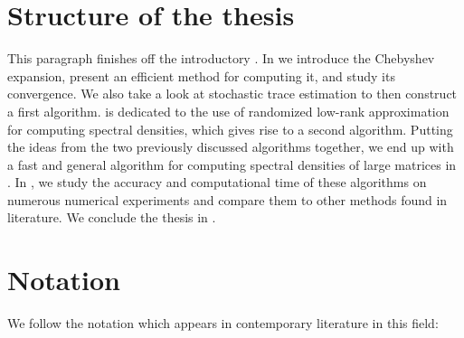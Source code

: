 \section{Structure of the thesis}
\label{sec:1-introduction-structure}

This paragraph finishes off the introductory .
In  we introduce the Chebyshev expansion, present an
efficient method for computing it, and study its convergence. We also take a
look at stochastic trace estimation to then construct a first algorithm.
 is dedicated to the use of randomized low-rank approximation
for computing spectral densities, which gives rise to a second algorithm.
Putting the ideas from the two previously discussed algorithms together,
we end up with a fast and general algorithm for computing spectral densities
of large matrices in . In ,
we study the accuracy and computational time of these algorithms on numerous
numerical experiments and compare them to other methods found in literature.
We conclude the thesis in .


\section{Notation}
\label{sec:1-introduction-notation}

We follow the notation which appears in contemporary literature in this field:

